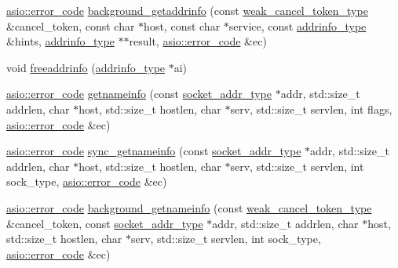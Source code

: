 \begin{DoxyCompactItemize}
\item 
\hyperlink{classasio_1_1error__code}{asio\+::error\+\_\+code} \hyperlink{namespaceasio_1_1detail_1_1socket__ops_a95f143eaae7546fb51cfd7856ac27786}{background\+\_\+getaddrinfo} (const \hyperlink{namespaceasio_1_1detail_1_1socket__ops_a9dbe5bfa22a69dc9a583a8060228860f}{weak\+\_\+cancel\+\_\+token\+\_\+type} \&cancel\+\_\+token, const char $\ast$host, const char $\ast$service, const \hyperlink{namespaceasio_1_1detail_ad8df56a17e3aa9ce2ad251fb76426e67}{addrinfo\+\_\+type} \&hints, \hyperlink{namespaceasio_1_1detail_ad8df56a17e3aa9ce2ad251fb76426e67}{addrinfo\+\_\+type} $\ast$$\ast$result, \hyperlink{classasio_1_1error__code}{asio\+::error\+\_\+code} \&ec)
\item 
void \hyperlink{namespaceasio_1_1detail_1_1socket__ops_a2b6faeb581fcd7c756181a7604043f71}{freeaddrinfo} (\hyperlink{namespaceasio_1_1detail_ad8df56a17e3aa9ce2ad251fb76426e67}{addrinfo\+\_\+type} $\ast$ai)
\item 
\hyperlink{classasio_1_1error__code}{asio\+::error\+\_\+code} \hyperlink{namespaceasio_1_1detail_1_1socket__ops_a599eab2306bdcbab292bd36fda70a0f3}{getnameinfo} (const \hyperlink{namespaceasio_1_1detail_a40a7b0385a38f87815ffbb8df5e34d05}{socket\+\_\+addr\+\_\+type} $\ast$addr, std\+::size\+\_\+t addrlen, char $\ast$host, std\+::size\+\_\+t hostlen, char $\ast$serv, std\+::size\+\_\+t servlen, int flags, \hyperlink{classasio_1_1error__code}{asio\+::error\+\_\+code} \&ec)
\item 
\hyperlink{classasio_1_1error__code}{asio\+::error\+\_\+code} \hyperlink{namespaceasio_1_1detail_1_1socket__ops_a378dbdadc17fcb7cd2c5f6428bacb296}{sync\+\_\+getnameinfo} (const \hyperlink{namespaceasio_1_1detail_a40a7b0385a38f87815ffbb8df5e34d05}{socket\+\_\+addr\+\_\+type} $\ast$addr, std\+::size\+\_\+t addrlen, char $\ast$host, std\+::size\+\_\+t hostlen, char $\ast$serv, std\+::size\+\_\+t servlen, int sock\+\_\+type, \hyperlink{classasio_1_1error__code}{asio\+::error\+\_\+code} \&ec)
\item 
\hyperlink{classasio_1_1error__code}{asio\+::error\+\_\+code} \hyperlink{namespaceasio_1_1detail_1_1socket__ops_acc165bb20c2a0c78b3ef4d69ffd3aa44}{background\+\_\+getnameinfo} (const \hyperlink{namespaceasio_1_1detail_1_1socket__ops_a9dbe5bfa22a69dc9a583a8060228860f}{weak\+\_\+cancel\+\_\+token\+\_\+type} \&cancel\+\_\+token, const \hyperlink{namespaceasio_1_1detail_a40a7b0385a38f87815ffbb8df5e34d05}{socket\+\_\+addr\+\_\+type} $\ast$addr, std\+::size\+\_\+t addrlen, char $\ast$host, std\+::size\+\_\+t hostlen, char $\ast$serv, std\+::size\+\_\+t servlen, int sock\+\_\+type, \hyperlink{classasio_1_1error__code}{asio\+::error\+\_\+code} \&ec)
$$
\end{DoxyCompactItemize}

